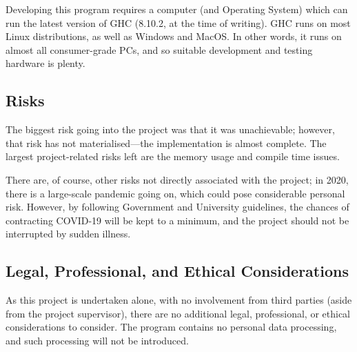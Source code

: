 \documentclass[12pt, a4paper]{scrartcl}
\begin{document}
Developing this program requires a computer (and Operating System) which can run the latest version of GHC (8.10.2, at the time of writing). GHC runs on most Linux distributions, as well as Windows and MacOS. In other words, it runs on almost all consumer-grade PCs, and so suitable development and testing hardware is plenty.

\subsection{Risks}

The biggest risk going into the project was that it was unachievable; however, that risk has not materialised---the implementation is almost complete. The largest project-related risks left are the memory usage and compile time issues. 

There are, of course, other risks not directly associated with the project; in 2020, there is a large-scale pandemic going on, which could pose considerable personal risk. However, by following Government and University guidelines, the chances of contracting COVID-19 will be kept to a minimum, and the project should not be interrupted by sudden illness.

\subsection{Legal, Professional, and Ethical Considerations}

As this project is undertaken alone, with no involvement from third parties (aside from the project supervisor), there are no additional legal, professional, or ethical considerations to consider. The program contains no personal data processing, and such processing will not be introduced.




\end{document}
